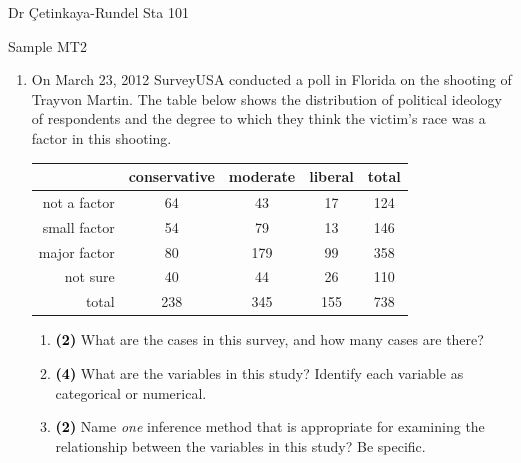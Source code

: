 \documentclass[11pt]{article}
\newcommand{\soln}[1]{ \vspace{1.35cm} }
\newcommand{\pts}[1]{ \textbf{{\footnotesize \textcolor{black}{(#1)}}} }	%
\begin{document}
%

Dr \c{C}etinkaya-Rundel \hfill Sta 101 \\

\begin{center}
{\LARGE Sample MT2}
\end{center}

\begin{enumerate}

\item On March 23, 2012 SurveyUSA conducted a poll in Florida on the shooting of Trayvon Martin. The table below shows the distribution of political ideology of respondents and the degree to which they think the victim's race was a factor in this shooting. \\

\begin{center}
\begin{tabular}{r c c c | c}
  \hline
 			& conservative & moderate	& liberal 	& total \\ 
  \hline
not a factor 	& 64 			&  43 		& 17 		& 124 \\ 
small factor 	& 54			&  79 		& 13 		& 146 \\ 
major factor	& 80 			& 179 		& 99		& 358 \\
not sure		& 40 			& 44 			& 26 		& 110 \\
   \hline
total			& 238		& 345		& 155 	& 738 \\
   \hline
\end{tabular}
\end{center}

\vspace{0.25cm}

\begin{enumerate}

\item \pts{2} What are the cases in this survey, and how many cases are there?

\soln{Cases in this study are 738 randomly selected Florida residents.}

\item \pts{4} What are the variables in this study? Identify each variable as categorical or numerical.

\soln{Variable 1: political ideology (categorical) \\
Variable 2: degree to which the respondent thinks the victim's race was a major factor in this shooting (categorical, ordinal)}

\item \pts{2} Name \emph{one} inference method that is appropriate for examining the relationship between the variables in this study? Be specific.


\end{enumerate}
\end{enumerate}
\end{document}
